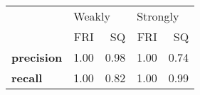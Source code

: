 \begin{tabular}{lrrrr}
\toprule
{} & \multicolumn{2}{l}{Weakly} & \multicolumn{2}{l}{Strongly} \\
{} &    FRI &   SQ &      FRI &   SQ \\
\midrule
\textbf{precision} &   1.00 & 0.98 &     1.00 & 0.74 \\
\textbf{recall   } &   1.00 & 0.82 &     1.00 & 0.99 \\
\bottomrule
\end{tabular}
